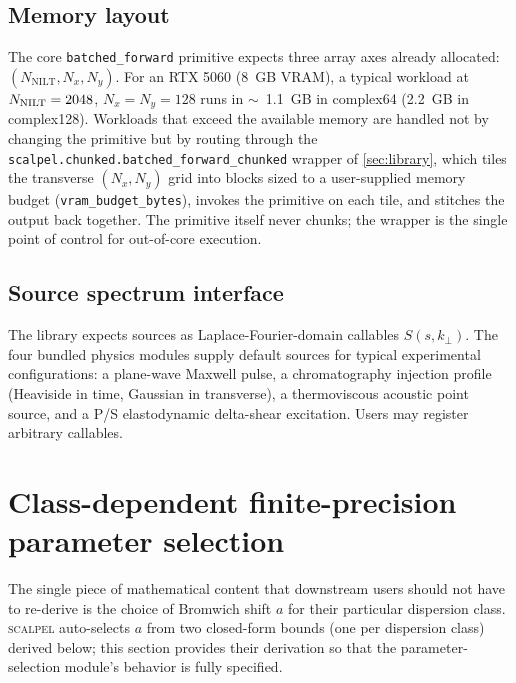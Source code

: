 \documentclass[manuscript,review]{acmart}
\newcommand{\kperp}{k_\perp}
\newcommand{\scalpel}{\textsc{scalpel}}
\begin{document}
\subsection{Memory layout}

The core \texttt{batched\_forward} primitive expects three array
axes already allocated: $(N_{\mathrm{NILT}}, N_x, N_y)$. For an RTX
5060 (8~GB VRAM), a typical workload at $N_{\rm NILT} = 2048$,
$N_x = N_y = 128$ runs in $\sim$~1.1~GB in complex64 (2.2~GB in
complex128). Workloads that exceed the available memory are handled
not by changing the primitive but by routing through the
\texttt{scalpel.chunked.batched\_forward\_chunked} wrapper of
\cref{sec:library}, which tiles the transverse $(N_x, N_y)$ grid
into blocks sized to a user-supplied memory budget
(\texttt{vram\_budget\_bytes}), invokes the primitive on each tile,
and stitches the output back together. The primitive itself never
chunks; the wrapper is the single point of control for out-of-core
execution.

\subsection{Source spectrum interface}

The library expects sources as Laplace-Fourier-domain callables
$S(s, \kperp)$. The four bundled physics modules supply default
sources for typical experimental configurations: a plane-wave Maxwell
pulse, a chromatography injection profile (Heaviside in time,
Gaussian in transverse), a thermoviscous acoustic point source, and
a P/S elastodynamic delta-shear excitation. Users may register
arbitrary callables.

\section{Class-dependent finite-precision parameter selection}\label{sec:feasibility-thm}

The single piece of mathematical content that downstream users
should not have to re-derive is the choice of Bromwich shift $a$ for
their particular dispersion class. \scalpel{} auto-selects $a$ from
two closed-form bounds (one per dispersion class) derived below;
this section provides their derivation so that the parameter-selection
module's behavior is fully specified.
\end{document}
